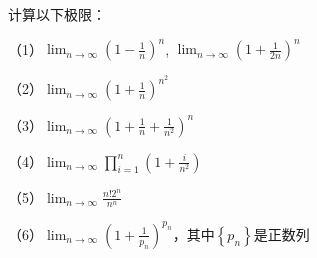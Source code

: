 \begin{example}
    计算以下极限：

    （1）\(\lim_{n \to \infty} {\left( 1 - \frac{1}{n} \right)}^{n}\),
    \(\lim_{n \to \infty} {\left( 1 + \frac{1}{2 n} \right)}^{n}\)

    （2）\(\lim_{n \to \infty} {\left( 1 + \frac{1}{n} \right)}^{n^{2}}\)

    （3）\(\lim_{n \to \infty} {\left( 1 + \frac{1}{n} + \frac{1}{n^{2}}
        \right)}^{n}\)

    （4）\(\lim_{n \to \infty} \prod _{i = 1}^{n} \left( 1 +
    \frac{i}{n^{2}} \right)\)

    （5）\(\lim_{n \to \infty} \frac{n ! 2^{n}}{n^{n}}\)

    （6）\(\lim_{n \to \infty} {\left( 1 +
        \frac{1}{p_{n}}\right)}^{p_{n}}\)，其中\(\left\{ p_{n} \right\}\)是正数列
\end{example}
